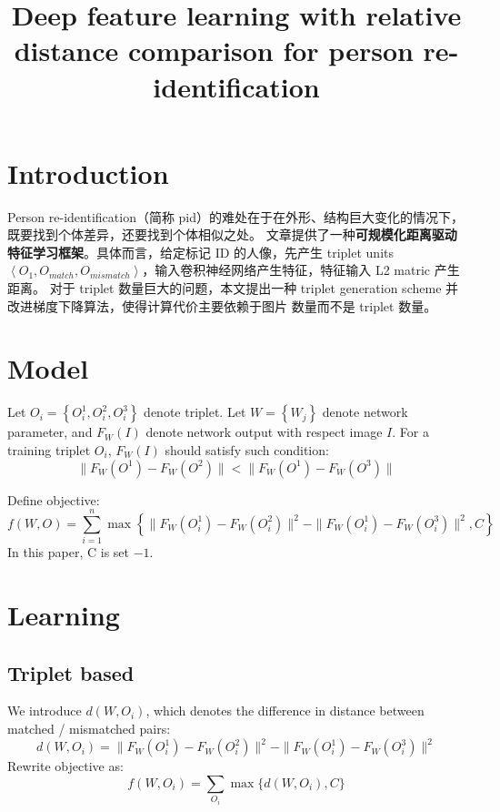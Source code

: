 

\title{Deep feature learning with relative distance comparison for person re-identification}
\maketitle

\section{Introduction}
Person re-identification（简称 pid）的难处在于在外形、结构巨大变化的情况下，既要找到个体差异，还要找到个体相似之处。
文章提供了一种\textbf{可规模化距离驱动特征学习框架}。具体而言，给定标记 ID 的人像，先产生 triplet units
$ \left< O_1, O_{match}, O_{mismatch} \right>$，输入卷积神经网络产生特征，特征输入 L2 matric 产生距离。
对于 triplet 数量巨大的问题，本文提出一种 triplet generation scheme 并改进梯度下降算法，使得计算代价主要依赖于图片
数量而不是 triplet 数量。

\section{Model}
Let $O_i = \left\{ O_i^1, O_i^2, O_i^3 \right\}$ denote triplet. Let $W = \left\{ W_j \right\}$ denote network
parameter, and $F_W(I)$ denote network output with respect image $I$. For a training triplet $O_i$, $F_W(I)$
should satisfy such condition:
\begin{equation}
	\parallel F_W(O^1) - F_W(O^2) \parallel < \parallel F_W(O^1) - F_W(O^3) \parallel
\end{equation}

Define objective:
\begin{equation}
	f(W, O) = \sum_{i=1}^{n} \max \left\{
		\parallel F_W(O_i^1) - F_W(O_i^2) \parallel^2 - \parallel F_W(O_i^1) - F_W(O_i^3) \parallel^2,
		C \right\}
\end{equation}
In this paper, C is set $-1$.

\section{Learning}

\subsection{Triplet based}
We introduce $d(W, O_i)$, which denotes the difference in distance between matched / mismatched pairs:
\begin{equation}
	d(W, O_i) = \parallel F_W(O_i^1) - F_W(O_i^2) \parallel^2 - \parallel F_W(O_i^1) - F_W(O_i^3) \parallel^2
\end{equation}
Rewrite objective as:
\begin{equation}
	f(W, O_i) = \sum_{O_i} \max \{ d(W, O_i), C \}
\end{equation}

